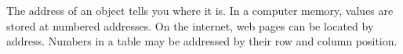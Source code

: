 The address of an object tells you where it is. In a computer memory, values are stored at numbered addresses. On the internet, web pages can be located by address. Numbers in a table may be addressed by their row and column position.